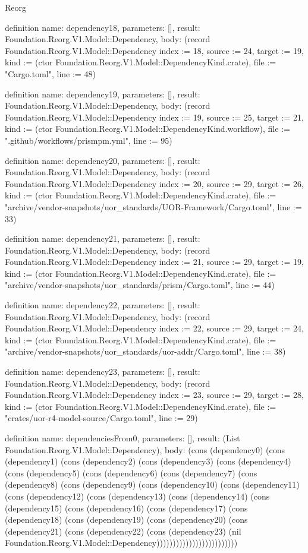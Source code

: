 \begin{lexlean}{Reorg}
\begin{semanticmodule}
definition{
  name: dependency18,
  parameters: [],
  result: Foundation.Reorg.V1.Model::Dependency,
  body: (record Foundation.Reorg.V1.Model::Dependency {index := 18, source := 24, target := 19, kind := (ctor Foundation.Reorg.V1.Model::DependencyKind.crate), file := "Cargo.toml", line := 48})
}

definition{
  name: dependency19,
  parameters: [],
  result: Foundation.Reorg.V1.Model::Dependency,
  body: (record Foundation.Reorg.V1.Model::Dependency {index := 19, source := 25, target := 21, kind := (ctor Foundation.Reorg.V1.Model::DependencyKind.workflow), file := ".github/workflows/prismpm.yml", line := 95})
}

definition{
  name: dependency20,
  parameters: [],
  result: Foundation.Reorg.V1.Model::Dependency,
  body: (record Foundation.Reorg.V1.Model::Dependency {index := 20, source := 29, target := 26, kind := (ctor Foundation.Reorg.V1.Model::DependencyKind.crate), file := "archive/vendor-snapshots/uor_standards/UOR-Framework/Cargo.toml", line := 33})
}

definition{
  name: dependency21,
  parameters: [],
  result: Foundation.Reorg.V1.Model::Dependency,
  body: (record Foundation.Reorg.V1.Model::Dependency {index := 21, source := 29, target := 19, kind := (ctor Foundation.Reorg.V1.Model::DependencyKind.crate), file := "archive/vendor-snapshots/uor_standards/prism/Cargo.toml", line := 44})
}

definition{
  name: dependency22,
  parameters: [],
  result: Foundation.Reorg.V1.Model::Dependency,
  body: (record Foundation.Reorg.V1.Model::Dependency {index := 22, source := 29, target := 24, kind := (ctor Foundation.Reorg.V1.Model::DependencyKind.crate), file := "archive/vendor-snapshots/uor_standards/uor-addr/Cargo.toml", line := 38})
}

definition{
  name: dependency23,
  parameters: [],
  result: Foundation.Reorg.V1.Model::Dependency,
  body: (record Foundation.Reorg.V1.Model::Dependency {index := 23, source := 29, target := 28, kind := (ctor Foundation.Reorg.V1.Model::DependencyKind.crate), file := "crates/uor-r4-model-source/Cargo.toml", line := 29})
}

definition{
  name: dependenciesFrom0,
  parameters: [],
  result: (List Foundation.Reorg.V1.Model::Dependency),
  body: (cons (dependency0) (cons (dependency1) (cons (dependency2) (cons (dependency3) (cons (dependency4) (cons (dependency5) (cons (dependency6) (cons (dependency7) (cons (dependency8) (cons (dependency9) (cons (dependency10) (cons (dependency11) (cons (dependency12) (cons (dependency13) (cons (dependency14) (cons (dependency15) (cons (dependency16) (cons (dependency17) (cons (dependency18) (cons (dependency19) (cons (dependency20) (cons (dependency21) (cons (dependency22) (cons (dependency23) (nil Foundation.Reorg.V1.Model::Dependency)))))))))))))))))))))))))
}


\end{semanticmodule}
\end{lexlean}
